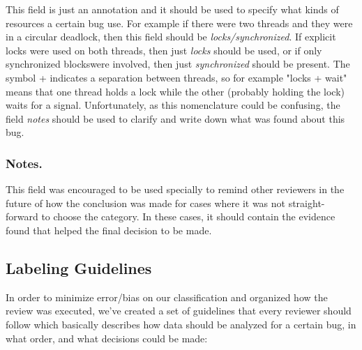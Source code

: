 This field is just an annotation and it should be used to specify what kinds of resources a certain bug use. For example if there were two threads and they were in a circular deadlock, then this field should be \emph{locks/synchronized}. If explicit locks were used on both threads, then just \emph{locks} should be used, or if only synchronized blockswere involved, then just \emph{synchronized} should be present. The symbol + indicates a separation between threads, so for example "locks + wait" means that one thread holds a lock while the other (probably holding the lock) waits for a signal. Unfortunately, as this nomenclature could be confusing, the field \emph{notes} should be used to clarify and write down what was found about this bug.

\subsubsection{Notes.}

This field was encouraged to be used specially to remind other reviewers in the future of how the conclusion was made for cases where it was not straight-forward to choose the category. In these cases, it should contain the evidence found that helped the final decision to be made.

\subsection{Labeling Guidelines} 

In order to minimize error/bias on our classification and organized how the review was executed, we've created a set of guidelines that every reviewer should follow which basically describes how data should be analyzed for a certain bug, in what order, and what decisions could be made:

